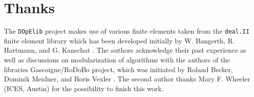 \documentclass[smallextended]{svjour3}       %
\numberwithin{equation}{section}
\newcommand{\deal}{\texttt{deal.II}}
\newcommand{\dope}{\texttt{DOpElib}}
\begin{document}
\section*{Thanks}
The \dope{} project makes use of various finite elements taken from  
the \deal{} \cite{dealnew} finite element library which has been developed
 initially by W. Bangerth, R. Hartmann, and G. Kanschat \cite{dealold}.
The authors acknowledge their past experience as well as discussions 
on modularization of algorithms
with 
the authors of the libraries 
Gascoigne/RoDoBo project, which was initiated by 
Roland Becker, Dominik Meidner, and Boris Vexler \cite{rodobo}. 
The second author thanks Mary F. Wheeler (ICES, Austin) for the 
possibility to finish this work.

%


%
\end{document}
